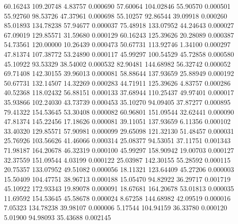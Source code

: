        60.16243      109.20748        4.83757       0.000690
       57.60064      104.02846       55.90570       0.000501
       55.92760       98.53726       47.37961       0.000698
       55.10257       92.86544       39.09918       0.000260
       85.01893      134.78238       57.94677       0.000037
       75.48918      133.07952       44.24643       0.000027
       67.09019      129.85571       31.59680       0.000129
       60.16243      125.39626       20.28089       0.000387
       54.73561      120.00000       10.26439       0.000473
       50.67731      113.92746        1.34100       0.000297
       47.81374      107.38772       53.24890       0.000117
       45.99297      100.54529       45.72858       0.000580
       45.10922       93.53329       38.54002       0.000532
       82.90481      144.68982       56.32742       0.000052
       69.71408      142.30155       39.96013       0.000081
       58.88644      137.93659       25.88949       0.000192
       50.67731      132.14507       14.32269       0.000283
       44.71911      125.39626        4.83757       0.000286
       40.52368      118.02432       56.88151       0.000133
       37.68944      110.25437       49.97401       0.000017
       35.93866      102.24030       43.73739       0.000453
       35.10270       94.09405       37.87277       0.000895
       79.41322      154.53645       53.30408       0.000082
       60.96801      151.09544       32.62441       0.000090
       47.81374      145.22456       17.18626       0.000081
       39.11051      137.93659        6.11356       0.000102
       33.40320      129.85571       57.90981       0.000099
       29.65098      121.32130       51.48457       0.000031
       25.76926      103.56626       41.46066       0.000314
       25.08377       94.53051       37.11751       0.001343
       71.98187      164.20678       46.32319       0.000100
       45.99297      158.90942       19.00703       0.000127
       32.37559      151.09544        4.03199       0.000122
       25.03987      142.30155       55.28592       0.000115
       20.75357      133.07952       49.51082       0.000056
       18.11321      123.64409       45.27206       0.000003
       15.50409      104.47751       38.96713       0.000188
       15.05470       94.82922       36.29717       0.001719
       45.10922      172.93343       19.89078       0.000091
       18.67681      164.20678       53.01813       0.000035
       11.69592      154.53645       45.58678       0.000024
	8.67258      144.68982       42.09519       0.000016
	7.05323      134.78238       39.98107       0.000006
	5.17544      104.94159       36.33780       0.000120
	5.01900       94.98093       35.43688       0.002145
